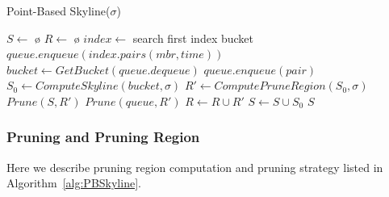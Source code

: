\begin{algorithm}
\caption{Point-Based Skyline($\sigma$)} \label{alg:PBSkyline}
\begin{algorithmic}[1]

\STATE $S \gets$ \o
\STATE $R \gets$ \o
\STATE $index \gets$ search first index bucket
\STATE $queue.enqueue(index.pairs(mbr, time))$
    \STATE $bucket \gets GetBucket(queue.dequeue)$
                \STATE $queue.enqueue(pair)$
            \ENDIF
        \ENDFOR
    \ELSE
        \STATE $S_0 \gets ComputeSkyline(bucket, \sigma)$
        \STATE $R' \gets ComputePruneRegion(S_0, \sigma)$
        \STATE $Prune(S, R')$
        \STATE $Prune(queue, R')$
        \STATE $R \gets R \cup R'$
        \STATE $S \gets S \cup S_0$
    \ENDIF
\ENDWHILE \RETURN $S$
\end{algorithmic}
\end{algorithm}

%

\subsubsection{Pruning and Pruning Region}
Here we describe pruning region computation and pruning strategy listed in
Algorithm~\ref{alg:PBSkyline}.


